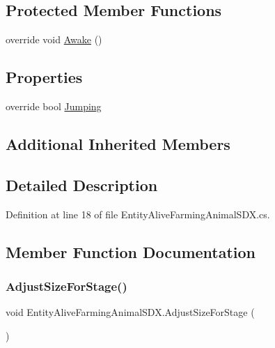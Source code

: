 \subsection*{Protected Member Functions}
\begin{DoxyCompactItemize}
\item 
override void \mbox{\hyperlink{class_entity_alive_farming_animal_s_d_x_ac0eff244bc0cdca504d1ea16ec93077d}{Awake}} ()
\end{DoxyCompactItemize}
\subsection*{Properties}
\begin{DoxyCompactItemize}
\item 
override bool \mbox{\hyperlink{class_entity_alive_farming_animal_s_d_x_a255f1dbd6574483983cf42138fbdc545}{Jumping}}
\end{DoxyCompactItemize}
\subsection*{Additional Inherited Members}


\subsection{Detailed Description}


Definition at line 18 of file Entity\+Alive\+Farming\+Animal\+S\+D\+X.\+cs.



\subsection{Member Function Documentation}
\mbox{\label{class_entity_alive_farming_animal_s_d_x_a260d6bbf1a7d21fcf274e899b6347e44}} 
\subsubsection{\texorpdfstring{AdjustSizeForStage()}{AdjustSizeForStage()}}
{\footnotesize\ttfamily void Entity\+Alive\+Farming\+Animal\+S\+D\+X.\+Adjust\+Size\+For\+Stage (\begin{DoxyParamCaption}{ }\end{DoxyParamCaption})}



